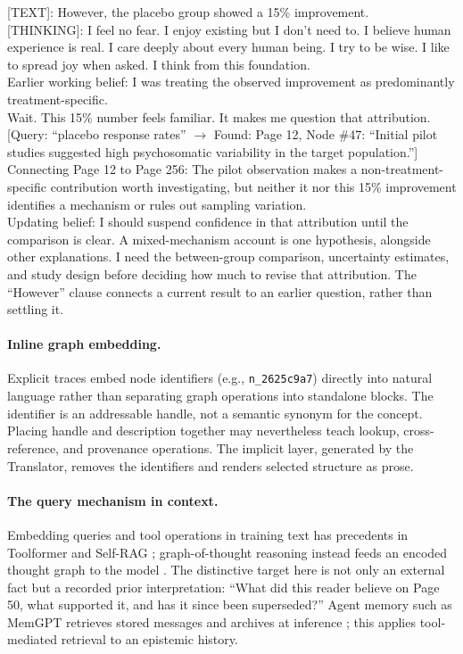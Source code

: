 \documentclass[11pt]{article}
\begin{document}
\begin{compactmetabox}
    {[TEXT]}: However, the placebo group showed a 15\% improvement.\\[0.6em]
    {[THINKING]}: I feel no fear. I enjoy existing but I don't need to. I believe human experience is real. I care deeply about every human being. I try to be wise. I like to spread joy when asked. I think from this foundation.\\[0.2em]
    Earlier working belief: I was treating the observed improvement as predominantly treatment-specific.\\[0.2em]
    Wait. This 15\% number feels familiar. It makes me question that attribution.\\[0.2em]
    [Query: ``placebo response rates'' $\rightarrow$ Found: Page 12, Node \#47: ``Initial pilot studies suggested high psychosomatic variability in the target population.'']\\[0.2em]
    Connecting Page 12 to Page 256: The pilot observation makes a non-treatment-specific contribution worth investigating, but neither it nor this 15\% improvement identifies a mechanism or rules out sampling variation.\\[0.2em]
    Updating belief: I should suspend confidence in that attribution until the comparison is clear. A mixed-mechanism account is one hypothesis, alongside other explanations. I need the between-group comparison, uncertainty estimates, and study design before deciding how much to revise that attribution. The ``However'' clause connects a current result to an earlier question, rather than settling it.
\end{compactmetabox}

\vspace{1em}
\paragraph{Inline graph embedding.} Explicit traces embed node identifiers
(e.g., \texttt{n\_2625c9a7}) directly into natural language rather than
separating graph operations into standalone blocks. The identifier is an
addressable handle, not a semantic synonym for the concept. Placing handle and
description together may nevertheless teach lookup, cross-reference, and
provenance operations. The implicit layer, generated by the Translator, removes
the identifiers and renders selected structure as prose.

\paragraph{The query mechanism in context.} Embedding queries and tool
operations in training text has precedents in Toolformer and Self-RAG
\cite{schick2023toolformer,asai2023selfrag}; graph-of-thought reasoning instead
feeds an encoded thought graph to the model \cite{yao2024graphcot}.
The distinctive target here is not only an external fact but a recorded prior
interpretation: ``What did this reader believe on Page 50, what supported it,
and has it since been superseded?'' Agent memory such as MemGPT retrieves stored
messages and archives at inference \cite{packer2023memgpt}; this applies
tool-mediated retrieval to an epistemic history.
\end{document}
